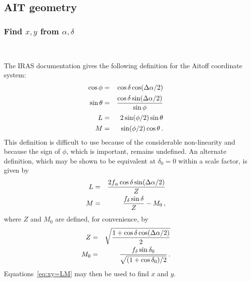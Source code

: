 \subsection{AIT geometry\protect\footnotemark}

\subsubsection{Find $x,y$ from $\alpha,\delta$}\

     The IRAS documentation gives the following definition for the
Aitoff coordinate system:
\begin{eqnarray*}
   \cos\phi & = &\cos\delta \cos\hda \\
      \noalign{\vskip 0.8pt}
   \sin\theta & = &\frac{\cos\delta\sin\hda}{\sin\phi} \\
       \noalign{\vskip 0.8pt}
   L          & = &2\sin(\phi/2)\sin\theta \\
       \noalign{\vskip 0.8pt}
   M          & = &\sin(\phi/2)\cos\theta \, .
\end{eqnarray*}
This definition is difficult to use because of the considerable
non-linearity and because the sign of $\phi$, which is important,
remains undefined.  An alternate definition, which may be shown to be
equivalent at $\delta_0 = 0$ within a scale factor, is given by
\begin{eqnarray}
   L & = &\frac{2f_{\alpha}\cos\delta\sin(\Delta\alpha/2)}{Z} \nonumber\\
   M & = &\frac{f_{\delta}\sin\delta}{Z} -M_0 \, , \label{eq:AITLM}
\end{eqnarray}
where $Z$ and $M_0$ are defined, for convenience, by
\begin{eqnarray*}
   Z    & = &\sqrt{\frac{1 + \cos\delta\cos(\Delta\alpha/2)}{2}} \\
   M_0  & = &\frac{f_{\delta}\sin\delta_0}{\strut\sqrt{(1+\cos\delta_0)/2}}
                 \, .
\end{eqnarray*}
Equations~\ref{eq:xy=LM} may then be used to find $x$ and $y$.

